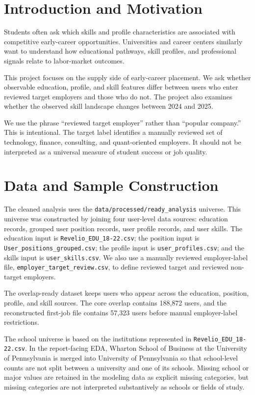 \documentclass[11pt]{article}
\begin{document}
\section{Introduction and Motivation}

Students often ask which skills and profile characteristics are associated with competitive early-career opportunities. Universities and career centers similarly want to understand how educational pathways, skill profiles, and professional signals relate to labor-market outcomes.

This project focuses on the supply side of early-career placement. We ask whether observable education, profile, and skill features differ between users who enter reviewed target employers and those who do not. The project also examines whether the observed skill landscape changes between 2024 and 2025.

We use the phrase ``reviewed target employer'' rather than ``popular company.'' This is intentional. The target label identifies a manually reviewed set of technology, finance, consulting, and quant-oriented employers. It should not be interpreted as a universal measure of student success or job quality.

\section{Data and Sample Construction}

The cleaned analysis uses the \texttt{data/processed/ready\_analysis} universe. This universe was constructed by joining four user-level data sources: education records, grouped user position records, user profile records, and user skills. The education input is \texttt{Revelio\_EDU\_18-22.csv}; the position input is \texttt{User\_positions\_grouped.csv}; the profile input is \texttt{user\_profiles.csv}; and the skills input is \texttt{user\_skills.csv}. We also use a manually reviewed employer-label file, \texttt{employer\_target\_review.csv}, to define reviewed target and reviewed non-target employers.

The overlap-ready dataset keeps users who appear across the education, position, profile, and skill sources. The core overlap contains 188,872 users, and the reconstructed first-job file contains 57,323 users before manual employer-label restrictions.

The school universe is based on the institutions represented in \texttt{Revelio\_EDU\_18-22.csv}. In the report-facing EDA, Wharton School of Business at the University of Pennsylvania is merged into University of Pennsylvania so that school-level counts are not split between a university and one of its schools. Missing school or major values are retained in the modeling data as explicit missing categories, but missing categories are not interpreted substantively as schools or fields of study.
\end{document}
